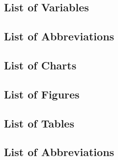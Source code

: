 \documentclass[
	12pt, 
	]{article}
\numberwithin{equation}{section}
\theoremstyle{definition}
\theoremstyle{plain}
\theoremstyle{plain}
\theoremstyle{plain}
\begin{document}

\subsection*{List of Variables}



\thispagestyle{empty}



\subsection*{List of Abbreviations}

\thispagestyle{empty}


\subsection*{List of Charts} %

\thispagestyle{empty}


\subsection*{List of Figures} %

\thispagestyle{empty}


\subsection*{List of Tables} %

\thispagestyle{empty}


\subsection*{List of Abbreviations} %

\thispagestyle{empty}
\end{document}
